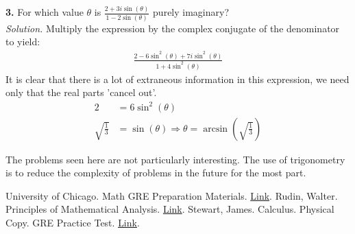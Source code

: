 \textbf{3.} For which value $\theta$ is $\frac{2+3i\sin(\theta)}{1-2\sin(\theta)}$ purely imaginary?\\

\textit{Solution.} Multiply the expression by the complex conjugate of the denominator to yield:
\begin{align*}
	\frac{2 - 6\sin^{2}(\theta)+7i\sin^{2}(\theta)}{1 + 4\sin^{2}(\theta)}
\end{align*}
It is clear that there is a lot of extraneous information in this expression, we need only that the real parts 'cancel out'.
\begin{align*}
	2 &= 6\sin^{2}(\theta)\\
	\sqrt{\frac{1}{3}} &= \sin(\theta) \Rightarrow \theta = \arcsin\left(\sqrt{\frac{1}{3}}\right)
\end{align*}

The problems seen here are not particularly interesting. The use of trigonometry is to
reduce the complexity of problems in the future for the most part.
\begin{thebibliography}{9}
	University of Chicago. Math GRE Preparation Materials. \href{https://math.uchicago.edu/~min/GRE/}{Link}.
	Rudin, Walter. Principles of Mathematical Analysis. \href{https://notendur.hi.is/vae11/\%C3\%9Eekking/principles_of_mathematical_analysis_walter_rudin.pdf}{Link}.
	Stewart, James. Calculus. Physical Copy.
	GRE Practice Test. \href{https://www.ets.org/s/gre/pdf/practice_book_math.pdf}{Link}. 
\end{thebibliography}



